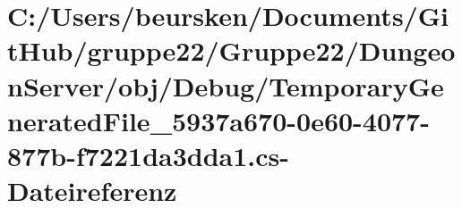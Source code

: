\hypertarget{_dungeon_server_2obj_2_debug_2_temporary_generated_file__5937a670-0e60-4077-877b-f7221da3dda1_8cs}{\section{C\-:/\-Users/beursken/\-Documents/\-Git\-Hub/gruppe22/\-Gruppe22/\-Dungeon\-Server/obj/\-Debug/\-Temporary\-Generated\-File\-\_\-5937a670-\/0e60-\/4077-\/877b-\/f7221da3dda1.cs-\/\-Dateireferenz}
\label{_dungeon_server_2obj_2_debug_2_temporary_generated_file__5937a670-0e60-4077-877b-f7221da3dda1_8cs}
}
